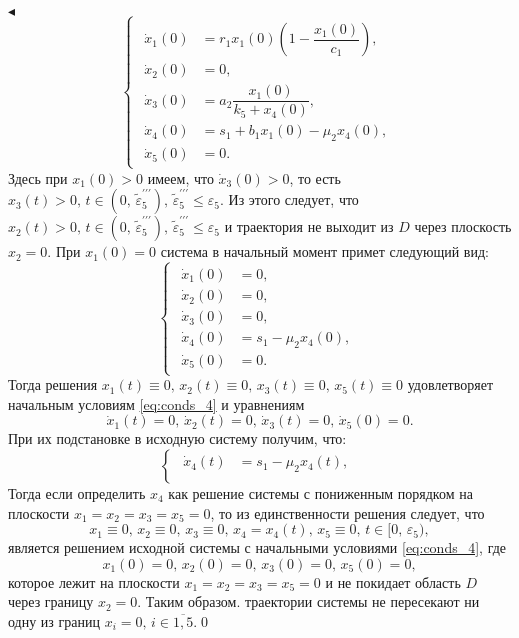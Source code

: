 \documentclass[12pt,a4paper]{extarticle}
\renewenvironment{proof}{\noindent$\blacktriangleleft$}{}
\theoremstyle{definition}
\theoremstyle{definition}
\theoremstyle{definition}
\begin{document}
\begin{proof}
		\begin{equation*}
			\begin{cases}
				\begin{aligned}
					\dot{x}_1(0) &= r_1x_1(0)\left(1-\dfrac{x_1(0)}{c_1}\right),\\
					\dot{x}_2(0) &= 0,\\
					\dot{x}_3(0) &= a_2\dfrac{x_1(0)}{k_5+x_4(0)},\\
					\dot{x}_4(0) &= s_1 + b_1x_1(0)-\mu_2x_4(0),\\
					\dot{x}_5(0) &= 0.
				\end{aligned}
			\end{cases}
		\end{equation*} 
		Здесь при $x_1(0)>0$ имеем, что $\dot{x}_3(0)>0$, то есть $x_3(t)>0,\, t\in(0,\, \tilde{\varepsilon}^{\prime\prime\prime}_5),\,\tilde{\varepsilon}^{\prime\prime\prime}_5\le\varepsilon_5$. Из этого следует, что $x_2(t)>0,\, t\in(0,\, \tilde{\varepsilon}^{\prime\prime\prime}_5),\,\tilde{\varepsilon}^{\prime\prime\prime}_5\le\varepsilon_5$ и траектория не выходит из $D$ через плоскость $x_2=0$. При $x_1(0)=0$ система в начальный момент примет следующий вид:
		\begin{equation*}
			\begin{cases}
				\begin{aligned}
					\dot{x}_1(0) &= 0,\\
					\dot{x}_2(0) &= 0,\\
					\dot{x}_3(0) &= 0,\\
					\dot{x}_4(0) &= s_1 - \mu_2x_4(0),\\
					\dot{x}_5(0) &= 0.
				\end{aligned}
			\end{cases}
		\end{equation*}
		Тогда решения $x_1(t)\equiv0,\, x_2(t)\equiv0,\, x_3(t)\equiv0,\, x_5(t)\equiv0$ удовлетворяет начальным условиям \ref{eq:conds_4} и уравнениям 
		\[\dot{x}_1(t)=0,\, \dot{x}_2(t)=0,\, \dot{x}_3(t)=0,\, \dot{x}_5(0)=0.\] 
		При их подстановке в исходную систему получим, что:
		\begin{equation*}
			\begin{cases}
				\begin{aligned}
					\dot{x}_4(t) &= s_1-\mu_2x_4(t),\\
				\end{aligned}
			\end{cases}
		\end{equation*} 
		Тогда если определить $x_4$ как решение системы с пониженным порядком на плоскости $x_1=x_2=x_3=x_5=0$, то из единственности решения следует, что
		\[x_1\equiv0,\, x_2\equiv0,\, x_3\equiv0,\, x_4=x_4(t),\, x_5\equiv0,\, t\in[0,\,\varepsilon_5),\]
		является решением исходной системы с начальными условиями \ref{eq:conds_4}, где
		\[x_1(0)=0,\, x_2(0)=0,\, x_3(0)=0,\, x_5(0)=0,\]
		которое лежит на плоскости $x_1=x_2=x_3=x_5=0$ и не покидает область $D$ через границу $x_2=0$. Таким образом. траектории системы не пересекают ни одну из границ $x_i=0,\, i\in\overline{1,5}$.\qed
	\end{proof}
	
\end{document}
